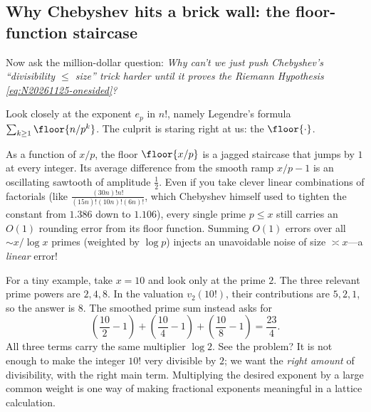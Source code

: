 \subsection{Why Chebyshev hits a brick wall: the floor-function staircase}

Now ask the million-dollar question: \emph{Why can't we just push Chebyshev's ``divisibility \(\le\) size'' trick harder until it proves the Riemann Hypothesis \eqref{eq:N20261125-onesided}?}

Look closely at the exponent \(e_p\) in \(n!\), namely Legendre's formula \(\sum_{k\ge 1} \floor{n/p^k}\). The culprit is staring right at us: the  \(\floor{\cdot}\).

As a function of \(x/p\), the floor \(\floor{x/p}\) is a jagged staircase that jumps by \(1\) at every integer. Its average difference from the smooth ramp \(x/p - 1\) is an oscillating sawtooth of amplitude \(\tfrac{1}{2}\). Even if you take clever linear combinations of factorials (like \(\frac{(30n)!n!}{(15n)!(10n)!(6n)!}\), which Chebyshev himself used to tighten the constant from \(1.386\) down to \(1.106\)), every single prime \(p \le x\) still carries an \(O(1)\) rounding error from its floor function. Summing \(O(1)\) errors over all \(\sim x/\log x\) primes (weighted by \(\log p\)) injects an unavoidable noise of size \(\asymp x\)---a \emph{linear} error!

For a tiny example, take \(x=10\) and look only at the prime \(2\). The three relevant prime powers are \(2,4,8\). In the valuation \(v_2(10!)\), their contributions are \(5,2,1\), so the answer is \(8\). The smoothed prime sum instead asks for
\[
 \left(\frac{10}{2}-1\right)
 +\left(\frac{10}{4}-1\right)
 +\left(\frac{10}{8}-1\right)=\frac{23}{4}.
\]
All three terms carry the same multiplier \(\log 2\). See the problem? It is not enough to make the integer \(10!\) very divisible by \(2\); we want the \emph{right amount} of divisibility, with the right main term. Multiplying the desired exponent by a large common weight is one way of making fractional exponents meaningful in a lattice calculation.


